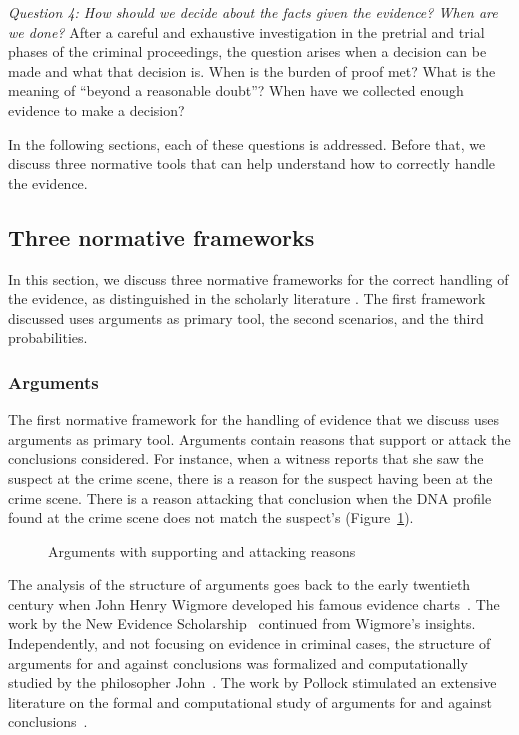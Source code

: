 \documentclass[10pt]{article}
\begin{document}
\textit{Question 4:	How should we decide about the facts given the evidence? When are we done?}
After a careful and exhaustive investigation in the pretrial and trial phases of the criminal proceedings, the question arises when a decision can be made and what that decision is. When is the burden of proof met? What is the meaning of ``beyond a reasonable doubt''? When have we collected enough evidence to make a decision?

In the following sections, each of these questions is addressed. Before that, we discuss three normative tools that can help understand how to correctly handle the evidence. 

\subsection{Three normative frameworks}

In this section, we discuss three normative frameworks for the correct handling of the evidence, as distinguished in the scholarly literature \citep{andersonEtal2005,kapteinEtal2009,dawidEtal2011}. The first framework discussed uses arguments as primary tool, the second scenarios, and the third probabilities. 

\subsubsection{Arguments}

The first normative framework for the handling of evidence that we discuss uses arguments as primary tool. Arguments contain reasons that support or attack the conclusions considered. For instance, when a witness reports that she saw the suspect at the crime scene, there is a reason for the suspect having been at the crime scene. There is a reason attacking that conclusion when the DNA profile found at the crime scene does not match the suspect's (Figure~\ref{fig:arg}). 

\begin{figure}[bt]
\centering

\caption{Arguments with supporting and attacking reasons\label{fig:arg}}
\end{figure}

The analysis of the structure of arguments goes back to the early twentieth century when John Henry Wigmore developed his famous evidence charts~\citep{wigmore1913,wigmore1931}. The work by the New Evidence Scholarship~\citep{andersonEtal2005} continued from Wigmore's insights. Independently, and not focusing on evidence in criminal cases, the structure of arguments for and against conclusions was formalized and computationally studied by the philosopher John~\citet{pollock1987,pollock1995}. The work by Pollock stimulated an extensive literature on the formal and computational study of arguments for and against conclusions~\citep{vanEemerenEtal2014Ch11}.
\end{document}
